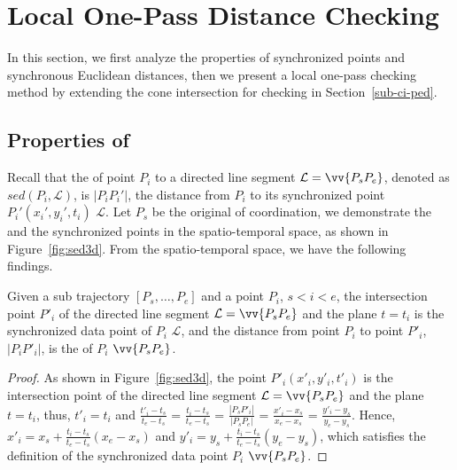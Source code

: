 \section{Local One-Pass Distance Checking}

In this section, we first analyze the properties of synchronized points and synchronous Euclidean distances, then we present a local one-pass \sed checking method by extending the cone intersection for \ped checking in Section~\ref{sub-ci-ped}.



\subsection{Properties of \sed} %
Recall that the \sed of point $P_i$ to a directed line segment $\mathcal{L} = \vv{P_{s}P_{e}}$, denoted as $sed(P_i, \mathcal{L})$, is $|P_iP_i'|$, the distance from $P_i$ to its synchronized point $P_i' (x_i', y_i', t_i)$ \wrt $\mathcal{L}$.
Let $P_s$ be the original of coordination, we demonstrate the \sed and the synchronized points in the spatio-temporal space, as shown in Figure~\ref{fig:sed3d}.
From the spatio-temporal space, we have the following findings.



\begin{lemma}
\label{prop-3d-syn-point}
Given a sub trajectory $[P_s, \ldots, P_e]$ and a point $P_i$, $s<i<e$, the intersection point $P'_i$ of the directed line segment $\mathcal{L} = \vv{P_sP_e}$ and the plane $t=t_i$ is the synchronized data point of $P_i$ \wrt $\mathcal{L}$,
and the distance from point $P_i$ to point $P'_i$, $|P_iP'_i|$, is the \sed of $P_i$ \wrt $\vv{P_sP_e}$.
\end{lemma}

\begin{proof}
As shown in Figure~\ref{fig:sed3d}, the point $P'_i (x'_i, y'_i, t'_i)$ is the intersection point of the directed line segment $\mathcal{L} = \vv{P_sP_e}$ and the plane $t=t_i$, thus, $t'_i = t_i$ and $\frac{t'_i - t_s}{t_e - t_s}$ = $\frac{t_i - t_s}{t_e - t_s}$  = $\frac{|P_sP'_i|}{|P_sP_e|}$ = $\frac{x'_i - x_s}{x_e - x_s}$ = $\frac{y'_i - y_s}{y_e - y_s}$. Hence, $x'_i = x_s +  \frac{t_i-t_s}{t_e - t_s}(x_e - x_s)$ and $y'_i = y_s +  \frac{t_i - t_s}{t_e - t_s}(y_e - y_s)$, which satisfies the definition of the synchronized data point $P_i$ \wrt $\vv{P_sP_e}$.
\end{proof}



